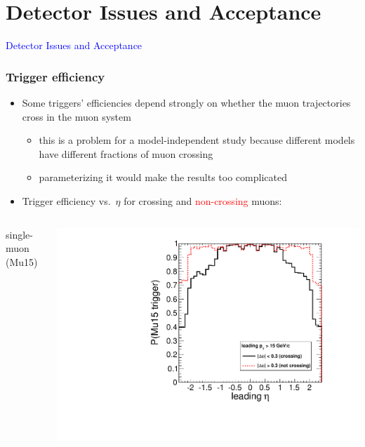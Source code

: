 \documentclass[compress]{beamer}
\begin{document}
\section*{Detector Issues and Acceptance}
\begin{frame}

\vfill
\begin{center}
\Huge \textcolor{blue}{Detector Issues and Acceptance}
\end{center}

\vfill
\end{frame}

\begin{frame}
\frametitle{Trigger efficiency}

\begin{itemize}
\item Some triggers' efficiencies depend strongly on whether the muon
  trajectories cross in the muon system
\begin{itemize}
\item this is a problem for a model-independent study because
  different models have different fractions of muon crossing
\item parameterizing it would make the results too complicated
\end{itemize}

\item Trigger efficiency vs.\ $\eta$ for crossing and \textcolor{red}{non-crossing} muons:
\end{itemize}

\begin{columns}
\centering single-muon (Mu15)

\includegraphics[width=\linewidth]{eta_mass5cut_triggerMu15_nosuppressedzero.pdf}


\end{columns}
\end{frame}
\end{document}
